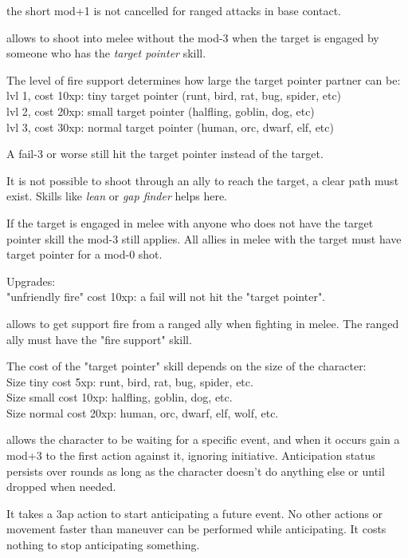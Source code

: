  the short mod+1 is not cancelled for ranged attacks in base contact.


 allows to shoot into melee without the mod-3 when the target is engaged by someone who has the \emph{target pointer} skill.

The level of fire support determines how large the target pointer partner can be:\\
lvl 1, cost 10xp: tiny target pointer (runt, bird, rat, bug, spider, etc) \\
lvl 2, cost 20xp: small target pointer (halfling, goblin, dog, etc) \\
lvl 3, cost 30xp: normal target pointer (human, orc, dwarf, elf, etc)

A fail-3 or worse still hit the target pointer instead of the target.

It is not possible to shoot through an ally to reach the target, a clear path must exist. Skills like \emph{lean} or \emph{gap finder} helps here.

If the target is engaged in melee with anyone who does not have the target pointer skill the mod-3 still applies. All allies in melee with the target must have target pointer for a mod-0 shot.

Upgrades: \\
"unfriendly fire" cost 10xp: a fail will not hit the "target pointer".


 allows to get support fire from a ranged ally when fighting in melee. The ranged ally must have the "fire support" skill.

The cost of the "target pointer" skill depends on the size of the character: \\
Size tiny cost 5xp: runt, bird, rat, bug, spider, etc. \\
Size small cost 10xp: halfling, goblin, dog, etc. \\
Size normal cost 20xp: human, orc, dwarf, elf, wolf, etc.


 allows the character to be waiting for a specific event, and when it occurs gain a mod+3 to the first action against it, ignoring initiative. Anticipation status persists over rounds as long as the character doesn't do anything else or until dropped when needed.

It takes a 3ap action to start anticipating a future event. No other actions or movement faster than maneuver can be performed while anticipating. It costs nothing to stop anticipating something.

